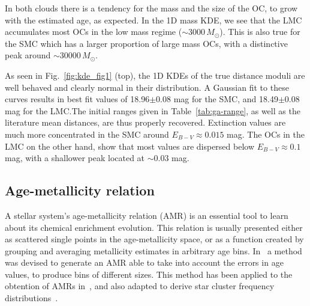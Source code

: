 \documentclass{aa}
\begin{document}
In both clouds there is a tendency for the mass and the size of the OC, to grow
with the estimated age, as expected. In the 1D mass KDE, we see that the LMC
accumulates most OCs in the low mass regime (${\sim}3000\,M_{\odot}$).
This is also true for the SMC which has a larger proportion of large mass OCs,
with a distinctive peak around ${\sim}30000\,M_{\odot}$.


As seen in Fig.~\ref{fig:kde_fig1} (top), the 1D KDEs of the true distance
moduli are well behaved and clearly normal in their distribution.
A Gaussian fit to these curves results in best fit values of 18.96$\pm$0.08 mag
for the SMC, and 18.49$\pm$0.08 mag for the LMC.\@ The initial ranges given in
Table~\ref{tab:ga-range}, as well as the literature mean distances, are thus
properly recovered.
%
Extinction values are much more concentrated in the SMC around $E_{B-V}
{\approx}0.015$ mag. The OCs in the LMC on the other hand, show that most
values are dispersed below $E_{B-V}{\approx}0.1$ mag, with a shallower peak
located at ${\sim}0.03$ mag.








\subsection{Age-metallicity relation}
\label{ssec:amr}

A stellar system's age-metallicity relation (AMR) is an essential tool to learn
about its chemical enrichment evolution.
This relation is usually presented either as scattered single points in the
age-metallicity space, or as a function created by grouping and averaging
metallicity estimates in arbitrary age bins.
%
In~\cite{Piatti_2010_AMR} a method was devised to generate an AMR able to take
into account the errors in age values, to produce bins of different sizes. This
method has been applied to the obtention of AMRs in~\cite{Piatti_Geisler_2013},
and also adapted to derive star cluster frequency distributions~\citep[e.g.,][]
{Piatti_2013_CF}.
\end{document}
